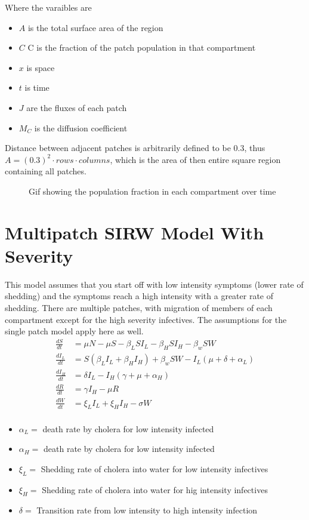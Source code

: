 \documentclass[12pt]{article}\usepackage[]{graphicx}\usepackage[]{color}
\begin{document}
Where the varaibles are
\begin{itemize}
    \item $A$ is the total surface area of the region
    \item $C$ C is the fraction of the patch population in that compartment
    \item $x$ is space
    \item $t$ is time
    \item $J$ are the fluxes of each patch
    \item $M_C$ is the diffusion coefficient
\end{itemize}
Distance between adjacent patches is arbitrarily defined to be $0.3$, thus $A= (0.3)^2 \cdot rows \cdot columns$, which is the area of then entire square region containing all patches.\\
\begin{figure}[htb!]
    \caption{ Gif showing the population fraction in each compartment over time}
\end{figure}
\section{Multipatch SIRW Model With Severity}

This model assumes that you start off with low intensity symptoms (lower rate of shedding) and the symptoms reach a high intensity with a greater rate of shedding.
There are multiple patches, with migration of members of each compartment except for the high severity infectives.
The assumptions for the single patch model apply here as well.
\begin{align*}
    \frac{dS}{dt}&= \mu N - \mu S - \beta_L S I_L - \beta_H S I_H - \beta_w S W  \\
    \frac{dI_L}{dt}&= S(\beta_L I_L + \beta_H I_H) + \beta_w S W - I_L (\mu + \delta + \alpha_L) \\
    \frac{dI_H}{dt}&= \delta I_L - I_H (\gamma + \mu + \alpha_H) \\
    \frac{dR}{dt}&= \gamma I_H - \mu R \\
    \frac{dW}{dt}&= \xi_L I_L + \xi_H I_H  - \sigma W\\
\end{align*}
\begin{itemize}
	\item $\alpha_L=$ death rate by cholera for low intensity infected
	\item $\alpha_H=$ death rate by cholera for low intensity infected
    \item $\xi_L=$ Shedding rate of cholera into water for low intensity infectives
    \item $\xi_H=$ Shedding rate of cholera into water for hig intensity infectives
	\item $\delta=$ Transition rate from low intensity to high intensity infection
\end{itemize}
\end{document}
